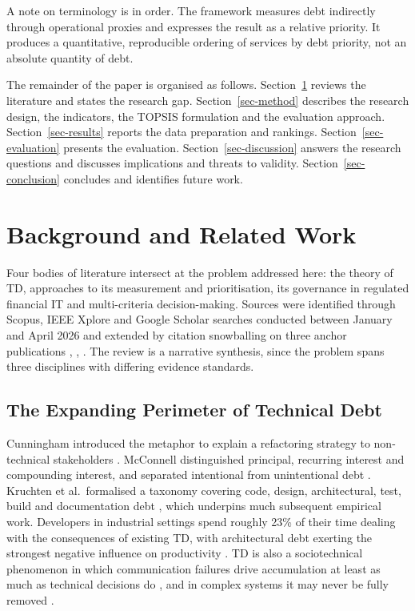 \documentclass[
  journal,
]{IEEEtran}%
\begin{document}
A note on terminology is in order. The framework measures debt
indirectly through operational proxies and expresses the result as a
relative priority. It produces a quantitative, reproducible ordering of
services by debt priority, not an absolute quantity of debt.

The remainder of the paper is organised as follows.
Section~\ref{sec-related} reviews the literature and states the research
gap. Section~\ref{sec-method} describes the research design, the
indicators, the TOPSIS formulation and the evaluation approach.
Section~\ref{sec-results} reports the data preparation and rankings.
Section~\ref{sec-evaluation} presents the evaluation.
Section~\ref{sec-discussion} answers the research questions and
discusses implications and threats to validity.
Section~\ref{sec-conclusion} concludes and identifies future work.

\section{Background and Related Work}\label{sec-related}

Four bodies of literature intersect at the problem addressed here: the
theory of TD, approaches to its measurement and prioritisation, its
governance in regulated financial IT and multi-criteria decision-making.
Sources were identified through Scopus, IEEE Xplore and Google Scholar
searches conducted between January and April 2026 and extended by
citation snowballing on three anchor publications
,
,
. The review is a
narrative synthesis, since the problem spans three disciplines with
differing evidence standards.

\subsection{The Expanding Perimeter of Technical
Debt}\label{the-expanding-perimeter-of-technical-debt}

Cunningham introduced the metaphor to explain a refactoring strategy to
non-technical stakeholders
.
McConnell distinguished principal, recurring interest and compounding
interest, and separated intentional from unintentional debt
. Kruchten et
al.~formalised a taxonomy covering code, design, architectural, test,
build and documentation debt
, which
underpins much subsequent empirical work. Developers in industrial
settings spend roughly 23\% of their time dealing with the consequences
of existing TD, with architectural debt exerting the strongest negative
influence on productivity
. TD is also a
sociotechnical phenomenon in which communication failures drive
accumulation at least as much as technical decisions do
, and in complex
systems it may never be fully removed
.
\end{document}
